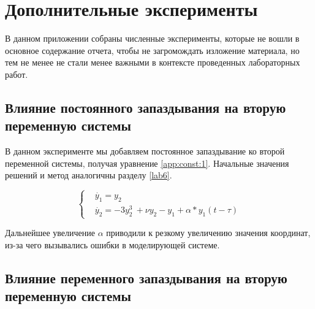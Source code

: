 \chapter{Дополнительные эксперименты}

В данном приложении собраны численные эксперименты, которые
не вошли в основное содержание отчета, чтобы не загромождать
изложение материала, но тем не менее не стали менее важными
в контексте проведенных лабораторных работ.

\section{Влияние постоянного запаздывания на вторую
переменную системы}\label{app:const}

В данном эксперименте мы добавляем постоянное запаздывание
ко второй переменной системы, получая уравнение \ref{app:const:1}.
Начальные значения решений и метод аналогичны разделу \ref{lab6}.

\begin{equation}\label{app:const:1}
    \begin{cases}
        &\dot{y_1} = y_2\\
        &\dot{y_2} = -3y_2^3\ + \nu y_2 - y_1  + \alpha * y_1(t-\tau)
    \end{cases}
\end{equation}

\clearpage
{}
Дальнейшее увеличение $\alpha$ приводили к резкому увеличению значения координат,
из-за чего вызывались ошибки в моделирующей системе.

\clearpage
\section{Влияние переменного запаздывания на вторую
переменную системы}\label{app:changeable}

